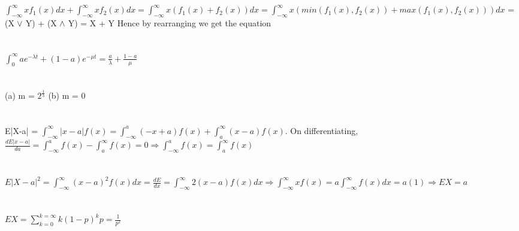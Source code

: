 \documentclass{report}
\begin{document}
\newcommand{\btimes}{\mathbin{\rotatebox[origin=c]{90}{$<$}}}
\newcommand{\atimes}{\mathbin{\rotatebox[origin=c]{-90}{$<$}}}

\section{}
{$\int_{-\infty}^{\infty}xf_{1}(x)dx + \int_{-\infty}^{\infty}xf_{2}(x)dx = \int_{-\infty}^{\infty}x(f_{1}(x) + f_{2}(x))dx = \int_{-\infty}^{\infty}x(min(f_{1}(x),f_{2}(x)) + max(f_{1}(x),f_{2}(x)))dx$} = (X $\btimes$ Y) + (X $\atimes$ Y) = X + Y
{\newline}
Hence by rearranging we get the equation
{\newline}

\section{}
{$\int_{0}^{\infty}ae^{-\lambda t} + (1-a)e^{-\mu t} = \frac{a}{\lambda} + \frac{1-a}{\mu}$}
{\newline}

\section{}
(a) m = {$2^{\frac{1}{3}}$}
{\newline}
(b) m = 0
{\newline}

\section{}
E|X-a| = {$\int_{-\infty}^{\infty}|x - a|f(x) = \int_{-\infty}^{a}(-x + a)f(x) + \int_{a}^{\infty}(x - a)f(x)$}. On differentiating,
{\newline}
{$\frac{d E|x - a|}{da} = \int_{-\infty}^{a}f(x) - {\int_{a}^{\infty}f(x) = 0} \Rightarrow  \int_{-\infty}^{a}f(x) = \int_{a}^{\infty}f(x)$} 
{\newline}

\section{}
{$E|X-a|^{2} = \int_{-\infty}^{\infty}(x-a)^{2}f(x)dx = \frac{dE}{dx} = \int_{-\infty}^{\infty}2(x-a)f(x)dx \Rightarrow \int_{-\infty}^{\infty}xf(x) = a{\int_{-\infty}^{\infty}f(x)dx} = a(1) \Rightarrow EX = a$}
{\newline}

\section{}
{$EX = {\sum_{k=0}^{k=\infty}k(1-p)^{k}p = \frac{1}{p^{2}}}$}
{\newline}
\end{document}
